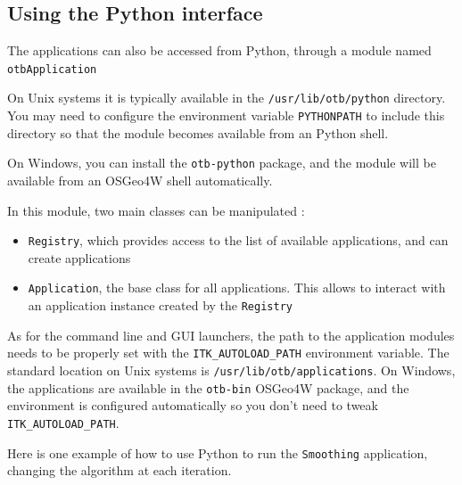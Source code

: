 \clearpage

\subsection{Using the Python interface}

The applications can also be accessed from Python, through a module named \verb?otbApplication?

On Unix systems it is typically available in the \verb?/usr/lib/otb/python? directory.
You may need to configure the environment variable \verb?PYTHONPATH? to include this directory
so that the module becomes available from an Python shell.

On Windows, you can install the \verb?otb-python? package, and the module will be available from
an OSGeo4W shell automatically.

In this module, two main classes can be manipulated :
\begin{itemize}
\item \verb?Registry?, which provides access to the list of available applications,
      and can create applications
\item \verb?Application?, the base class for all applications. This allows to interact with an application instance
      created by the \verb?Registry?
\end{itemize}

As for the command line and GUI launchers, the path to the application modules needs to
be properly set with the \verb?ITK_AUTOLOAD_PATH? environment variable.
The standard location on Unix systems is \verb?/usr/lib/otb/applications?.
On Windows, the applications are available in the \verb?otb-bin? OSGeo4W package, and
the environment is configured automatically so you don't need to tweak \verb?ITK_AUTOLOAD_PATH?.

Here is one example of how to use Python to run the \verb?Smoothing? application, changing the algorithm
at each iteration.

